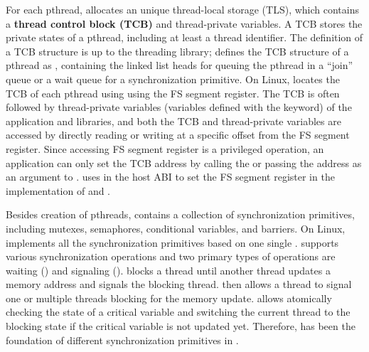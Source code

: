For each pthread, \libpthread{} allocates an unique thread-local storage (TLS), which contains a {\bf thread control block (TCB)} and thread-private variables.
A TCB stores the private states of a pthread, including at least a thread identifier.
The definition of a TCB structure is up to the threading library;
\libpthread{} defines the TCB structure of a pthread as ,
containing the linked list heads for queuing the pthread
in a ``join'' queue or a wait queue for a synchronization primitive.
On \graphenearch{} Linux, \libpthread{}
locates the TCB of each pthread using using the FS segment register.
The TCB is often
followed by thread-private variables (variables defined with the  keyword) of the application
and libraries,
and both the TCB and thread-private variables
are accessed by directly reading or writing at a specific offset from the FS segment register.
Since accessing FS segment register is a privileged operation,
an application can only set the TCB address
by calling the  \linuxapi{} or passing the address as an argument to .
\thelibos{} uses  in the host ABI
to set the FS segment register
in the implementation of  and .


Besides creation of pthreads, \libpthread{} contains a collection of synchronization primitives,
including mutexes, semaphores, conditional variables, and barriers.
On Linux, \libpthread{} implements all the synchronization primitives based on one single  \linuxapi{}.
 supports various synchronization operations and two primary types of operations are waiting () and signaling ().
blocks a thread until another thread updates a memory address
and signals the blocking thread.
 then allows a thread
to signal one or multiple threads blocking for the memory update.
allows atomically checking the state of a critical variable
and switching the current thread to the blocking state if the critical variable is not updated yet.
Therefore,  has been the foundation of different synchronization primitives in \libpthread{}.





